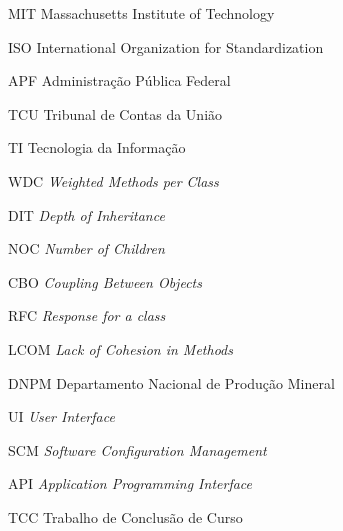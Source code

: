\begin{siglas}
  \item[MIT] Massachusetts Institute of Technology 
 \item[ISO] International Organization for Standardization
 \item[APF] Administração Pública Federal
 \item[TCU] Tribunal de Contas da União
 \item[TI] Tecnologia da Informação
 \item[WDC] \textit{Weighted Methods per Class}
 \item[DIT] \textit{Depth of Inheritance}
 \item[NOC] \textit{Number of Children}
 \item[CBO] \textit{Coupling Between Objects}
 \item[RFC] \textit{Response for a class}
 \item[LCOM] \textit{Lack of Cohesion in Methods}
 \item [DNPM] Departamento Nacional de Produção Mineral
 \item [UI] \textit{User Interface}
 \item [SCM] \textit{Software Configuration Management}
 \item [API] \textit{Application Programming Interface}
  \item [TCC] Trabalho de Conclusão de Curso
\end{siglas}
